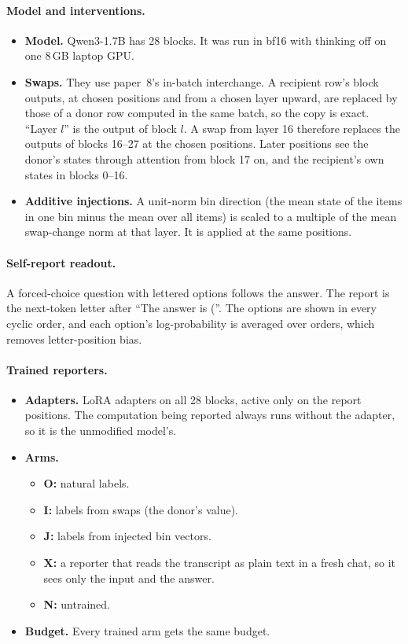 \documentclass[11pt]{article}
\begin{document}
\paragraph{Model and interventions.}
\begin{itemize}
\item \textbf{Model.} Qwen3-1.7B has 28 blocks. It was run in bf16 with thinking off on one 8\,GB laptop GPU.
\item \textbf{Swaps.} They use paper~8's in-batch interchange. A recipient row's block outputs, at chosen positions and from a chosen layer upward, are replaced by those of a donor row computed in the same batch, so the copy is exact. ``Layer $l$'' is the output of block $l$. A swap from layer 16 therefore replaces the outputs of blocks 16--27 at the chosen positions. Later positions see the donor's states through attention from block 17 on, and the recipient's own states in blocks 0--16.
\item \textbf{Additive injections.} A unit-norm bin direction (the mean state of the items in one bin minus the mean over all items) is scaled to a multiple of the mean swap-change norm at that layer. It is applied at the same positions.
\end{itemize}

\paragraph{Self-report readout.} A forced-choice question with lettered options follows the answer. The report is the next-token letter after ``The answer is (''. The options are shown in every cyclic order, and each option's log-probability is averaged over orders, which removes letter-position bias.

\paragraph{Trained reporters.}
\begin{itemize}
\item \textbf{Adapters.} LoRA adapters on all 28 blocks, active only on the report positions. The computation being reported always runs without the adapter, so it is the unmodified model's.
\item \textbf{Arms.}
  \begin{itemize}
  \item \textbf{O:} natural labels.
  \item \textbf{I:} labels from swaps (the donor's value).
  \item \textbf{J:} labels from injected bin vectors.
  \item \textbf{X:} a reporter that reads the transcript as plain text in a fresh chat, so it sees only the input and the answer.
  \item \textbf{N:} untrained.
  \end{itemize}
\item \textbf{Budget.} Every trained arm gets the same budget.
\end{itemize}
\end{document}
